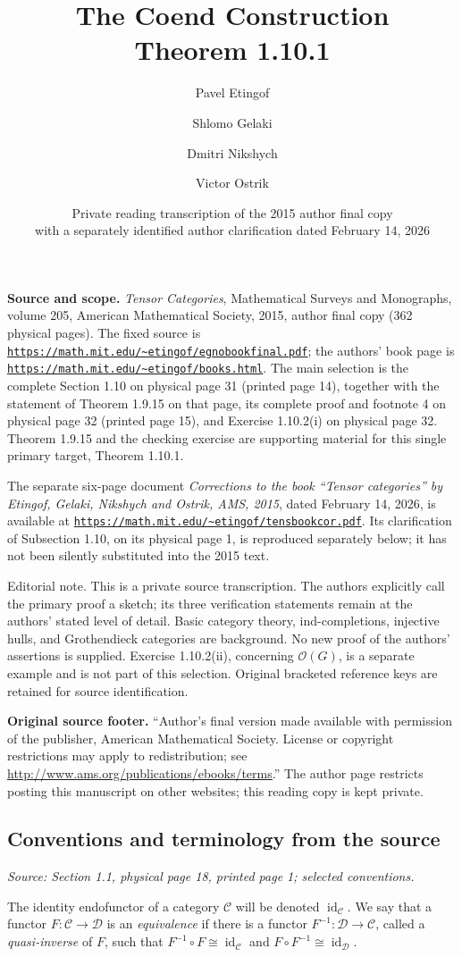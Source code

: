 \documentclass[11pt]{article}
\title{The Coend Construction\\Theorem 1.10.1}
\author{Pavel Etingof \and Shlomo Gelaki \and Dmitri Nikshych \and Victor Ostrik}
\date{Private reading transcription of the 2015 author final copy\\with a separately identified author clarification dated February 14, 2026}
\newcommand{\cC}{\mathcal{C}}
\newcommand{\cD}{\mathcal{D}}
\newcommand{\id}{\operatorname{id}}
\newcommand{\sourceloc}[1]{\par\smallskip\noindent\textit{Source: #1.}\par\smallskip}
\newcommand{\editorial}[1]{\par\smallskip\noindent\textsf{Editorial note.} #1\par\smallskip}
\begin{document}
\maketitle

\noindent\textbf{Source and scope.}
\emph{Tensor Categories}, Mathematical Surveys and Monographs, volume 205,
American Mathematical Society, 2015, author final copy (362 physical pages).
The fixed source is
\href{https://math.mit.edu/~etingof/egnobookfinal.pdf}{\nolinkurl{https://math.mit.edu/~etingof/egnobookfinal.pdf}};
the authors' book page is
\href{https://math.mit.edu/~etingof/books.html}{\nolinkurl{https://math.mit.edu/~etingof/books.html}}.
The main selection is the complete Section 1.10 on physical page 31
(printed page 14), together with the statement of Theorem 1.9.15 on that page,
its complete proof and footnote 4 on physical page 32 (printed page 15),
and Exercise 1.10.2(i) on physical page 32.
Theorem 1.9.15 and the checking exercise are supporting material for this
single primary target, Theorem 1.10.1.

The separate six-page document
\emph{Corrections to the book ``Tensor categories'' by Etingof, Gelaki,
Nikshych and Ostrik, AMS, 2015}, dated February 14, 2026, is available at
\href{https://math.mit.edu/~etingof/tensbookcor.pdf}{\nolinkurl{https://math.mit.edu/~etingof/tensbookcor.pdf}}.
Its clarification of Subsection 1.10, on its physical page 1, is reproduced
separately below; it has not been silently substituted into the 2015 text.

\editorial{This is a private source transcription. The authors explicitly call
the primary proof a sketch; its three verification statements remain at the
authors' stated level of detail. Basic category theory, ind-completions,
injective hulls, and Grothendieck categories are background. No new proof of
the authors' assertions is supplied. Exercise 1.10.2(ii), concerning
$\mathcal O(G)$, is a separate example and is not part of this selection.
Original bracketed reference keys are retained for source identification.}

\noindent\textbf{Original source footer.}
``Author's final version made available with permission of the publisher,
American Mathematical Society. License or copyright restrictions may apply
to redistribution; see
\url{http://www.ams.org/publications/ebooks/terms}.''
The author page restricts posting this manuscript on other websites; this
reading copy is kept private.

\subsection*{Conventions and terminology from the source}
\sourceloc{Section 1.1, physical page 18, printed page 1; selected conventions}
The identity endofunctor of a category $\cC$ will be denoted $\id_{\cC}$.
We say that a functor $F:\cC\to\cD$ is an \emph{equivalence} if there is a
functor $F^{-1}:\cD\to\cC$, called a \emph{quasi-inverse} of $F$, such that
$F^{-1}\circ F\cong\id_{\cC}$ and $F\circ F^{-1}\cong\id_{\cD}$.
\end{document}
